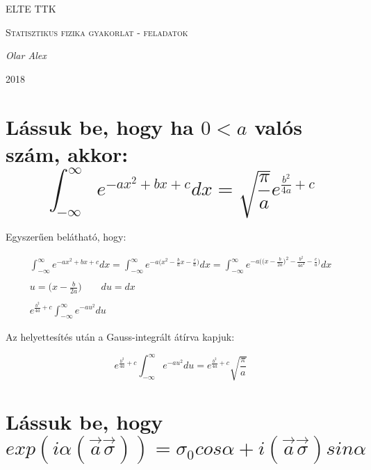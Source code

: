 \documentclass[a4paper,12pt]{article}
\begin{document}
\linespread{1.2}

\begin{titlepage}

	{\scshape\LARGE ELTE TTK \par}
	\vspace{3cm}
	{\scshape\Large Statisztikus fizika gyakorlat -  \large feladatok \par}
	\vspace{1cm}
	{\large\itshape Olar Alex\par}
	\vfill
	{\large 2018 \par}
	
\end{titlepage}

\section{Lássuk be, hogy ha $0 < a$ valós szám, akkor: \[\int_{-\infty}^{\infty}e^{-ax^{2} + bx + c}dx = \sqrt{\frac{\pi}{a}}e^{\frac{b^{2}}{4a} + c}\]}

\par Egyszerűen belátható, hogy:

\begin{equation*}
\begin{gathered}
\int_{-\infty}^{\infty}e^{-ax^{2} + bx + c}dx = \int_{-\infty}^{\infty}e^{-a\big(x^{2} - \frac{b}{a}x - \frac{c}{a}\big)}dx = \int_{-\infty}^{\infty}e^{-a\big(\big(x - \frac{b}{2a}\big)^{2} - \frac{b^{2}}{4a^{2}} - \frac{c}{a}\big)}dx \\ \\
u = \big(x - \frac{b}{2a}\big) \quad \quad du = dx \\ \\
e^{\frac{b^{2}}{4a} + c}\int_{-\infty}^{\infty}e^{-au^{2}}du
\end{gathered}
\end{equation*}

\par Az helyettesítés után a Gauss-integrált átírva kapjuk:

\begin{equation}
e^{\frac{b^{2}}{4a} + c}\int_{-\infty}^{\infty}e^{-au^{2}}du = e^{\frac{b^{2}}{4a} + c}\sqrt{\frac{\pi}{a}}
\end{equation}

\section{Lássuk be, hogy \[exp(i\alpha(\vec{a}\vec{\sigma})) = \sigma_{0}cos\alpha + i(\vec{a}\vec{\sigma})sin\alpha\]}
\end{document}
